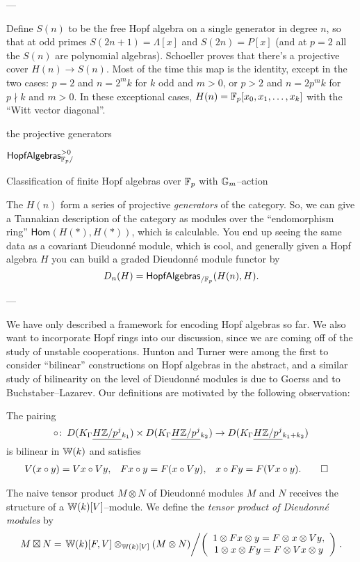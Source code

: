 ---

Define $S(n)$ to be the free Hopf algebra on a single generator in degree $n$, so that at odd primes $S(2n+1) = \Lambda[x]$ and $S(2n) = P[x]$ (and at $p = 2$ all the $S(n)$ are polynomial algebras).  Schoeller proves that there's a projective cover $H(n) \to S(n)$.  Most of the time this map is the identity, except in the two cases: $p = 2$ and $n = 2^m k$ for $k$ odd and $m > 0$, or $p > 2$ and $n = 2p^m k$ for $p \nmid k$ and $m > 0$.  In these exceptional cases, $H(n) = \mathbb F_p[x_0, x_1, \ldots, x_k]$ with the ``Witt vector diagonal''.

the projective generators

$\mathsf{HopfAlgebras}^{> 0}_{\mathbb F_p/}$

Classification of finite Hopf algebras over $\mathbb F_p$ with $\mathbb G_m$--action

The $H(n)$ form a series of projective \emph{generators} of the category.  So, we can give a Tannakian description of the category as modules over the ``endomorphism ring'' $\mathsf{Hom}(H(*), H(*))$, which is calculable.  You end up seeing the same data as a covariant Dieudonn\'e module, which is cool, and generally given a Hopf algebra $H$ you can build a graded Dieudonn\'e module functor by \[D_n(H) = \mathsf{HopfAlgebras}_{/\mathbb F_p}(H(n), H).\]

---

We have only described a framework for encoding Hopf algebras so far.  We also want to incorporate Hopf rings into our discussion, since we are coming off of the study of unstable cooperations.  Hunton and Turner were among the first to consider ``bilinear'' constructions on Hopf algebras in the abstract, and a similar study of bilinearity on the level of Dieudonn\'e modules is due to Goerss and to Buchstaber--Lazarev.  Our definitions are motivated by the following observation:

\begin{lemma}
The pairing \[\circ \colon\thinspace D(K_\Gamma \smash{\underline{H\mathbb Z/p^j}}_{k_1}) \times D(K_\Gamma \smash{\underline{H\mathbb Z/p^j}}_{k_2}) \to D(K_\Gamma \smash{\underline{H\mathbb Z/p^j}}_{k_1 + k_2})\] is bilinear in $\mathbb W(k)$ and satisfies
\begin{align*}
V(x \circ y) & = Vx \circ Vy, &
Fx \circ y & = F(x \circ Vy), &
x \circ Fy & = F(Vx \circ y). \qed
\end{align*}
\end{lemma}

\begin{definition}
The naive tensor product $M \otimes N$ of Dieudonn\'e modules $M$ and $N$ receives the structure of a $\mathbb W(k)[V]$--module.  We define the \textit{tensor product of Dieudonn\'e modules} by \[M \boxtimes N = \left.\mathbb W(k)[F, V] \otimes_{\mathbb W(k)[V]} (M \otimes N) \middle/ \left( \begin{array}{c} 1 \otimes Fx \otimes y = F \otimes x \otimes Vy, \\ 1 \otimes x \otimes Fy = F \otimes Vx \otimes y \end{array} \right) \right. .\]
\end{definition}

